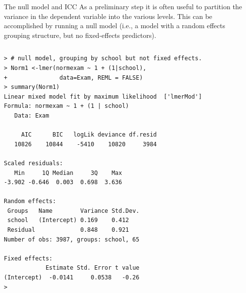\documentclass[table,smaller]{beamer}
\begin{document}
\begin{frame}[fragile,label=sec-5-3]{The null model and ICC}
 As a preliminary step it is often useful to partition the variance in the dependent variable into the various levels. This can be accomplished by running a null model (i.e., a model with a random effects grouping structure, but no fixed-effects predictors).

\vspace{-.5em}
\begin{columns}
\begin{block}{}
\begin{verbatim}
> # null model, grouping by school but not fixed effects.
> Norm1 <-lmer(normexam ~ 1 + (1|school),
+               data=Exam, REML = FALSE)
> summary(Norm1)
Linear mixed model fit by maximum likelihood  ['lmerMod']
Formula: normexam ~ 1 + (1 | school)
   Data: Exam

     AIC      BIC   logLik deviance df.resid 
   10826    10844    -5410    10820     3984 

Scaled residuals: 
   Min     1Q Median     3Q    Max 
-3.902 -0.646  0.003  0.698  3.636 

Random effects:
 Groups   Name        Variance Std.Dev.
 school   (Intercept) 0.169    0.412   
 Residual             0.848    0.921   
Number of obs: 3987, groups: school, 65

Fixed effects:
            Estimate Std. Error t value
(Intercept)  -0.0141     0.0538   -0.26
>
\end{verbatim}
\end{block}
\end{columns}
\vspace{.5em}
\end{frame}
\end{document}
